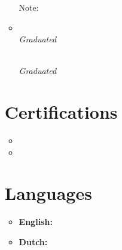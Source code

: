 \documentclass[11pt,a4paper]{article}
\begin{document}
\begin{itemize}[leftmargin=0pt,label={},itemsep=2em,topsep=0pt]
\begin{itemize}[leftmargin=0pt,label={},itemsep=2em]
{\color{secondary}Note:} \textit{\MastersNotableAchievement}


\item \parbox{\textwidth}{\textbf{\BatchelorsUniversity} \hfill \textit{\BatchelorsLocation}}\\
\textit{\BatchelorsCourse} \hfill \textit{Graduated \BatchelorsGraduation}
\parbox{\textwidth}{\textbf{\HEAOHogeschool} \hfill \textit{\HEAOsLocation}}\\
\textit{\HEAOCourse} \hfill \textit{Graduated \BatchelorsGraduation}
\end{itemize}



\vspace{0.5cm}
\section{Certifications}
\begin{itemize}[leftmargin=*,topsep=-6pt,parsep=0pt,partopsep=0pt,itemsep=0pt]
\item \CertMicrosoft
\item \CertDutch
\end{itemize}


\vspace{0.5cm}
\section{Languages}
\begin{itemize}[leftmargin=*]
\item \textbf{English:} \LangEnglish
\item \textbf{Dutch:} \LangDutch
\end{itemize} 

\end{itemize}
\end{document}
